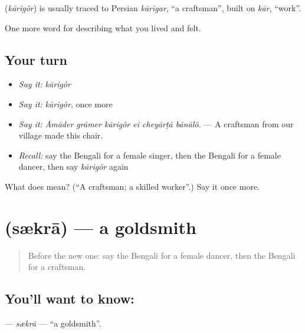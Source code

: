 \begin{cousinweb}
\textbf{} (\emph{kārigôr}) is usually traced to Persian \emph{kārīgar}, \textquotedblleft{}a craftsman\textquotedblright{}, built on \emph{kār}, \textquotedblleft{}work\textquotedblright{}.
\end{cousinweb}

\begin{grammarlens}[title={What you've built}]
One more word for describing what you lived and felt.
\end{grammarlens}

\subsection*{Your turn}
\begin{itemize}
\raggedright
  \item \emph{Say it:} \emph{kārigôr}
  \item \emph{Say it:} \emph{kārigôr}, once more
  \item \emph{Say it:} \emph{Āmāder grāmer kārigôr ei cheyārṭā bānālô.} — A craftsman from our village made this chair.
  \item \emph{Recall:} say the Bengali for a female singer, then the Bengali for a female dancer, then say \emph{kārigôr} again
\end{itemize}

\begin{tcolorbox}[breakable,colback=teal!4,colframe=teal!35!black,title={Before you move on}]
What does  mean? (\textquotedblleft{}A craftsman; a skilled worker\textquotedblright{}.) Say it once more.
\end{tcolorbox}
\section[\texorpdfstring{\bn{স্যাকরা} (sækrā)}{স্যাকরা (sækrā)}]{ (sækrā) — a goldsmith}

\label{lesson:BN-C492-sekra}



\begin{quote}
Before the new one: say the Bengali for a female dancer, then the Bengali for a craftsman.
\end{quote}

\subsection*{You'll want to know: }
\textbf{} — \emph{sækrā} — \textquotedblleft{}a goldsmith\textquotedblright{}.

